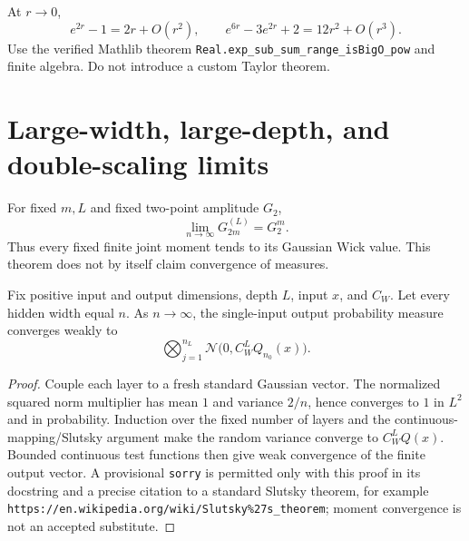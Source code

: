 \begin{lemma}
\label{lem:dln:expRemainders}
At $r\to0$,
\[
 e^{2r}-1=2r+O(r^2),\qquad
 e^{6r}-3e^{2r}+2=12r^2+O(r^3).
\]
Use the verified Mathlib theorem \texttt{Real.exp\_sub\_sum\_range\_isBigO\_pow} and finite
algebra.  Do not introduce a custom Taylor theorem.
\end{lemma}

\section{Large-width, large-depth, and double-scaling limits}

\begin{theorem}
\label{thm:dln:fixedDepthLimit}
For fixed $m,L$ and fixed two-point amplitude $G_2$,
\[
 \lim_{n\to\infty}G_{2m}^{(L)}=G_2^m.
\]
Thus every fixed finite joint moment tends to its Gaussian Wick value.  This theorem does not by
itself claim convergence of measures.
\end{theorem}

\begin{theorem}
\label{thm:dln:weakGaussianLimit}
Fix positive input and output dimensions, depth $L$, input $x$, and $C_W$.  Let every hidden width
equal $n$.  As $n\to\infty$, the single-input output probability measure converges weakly to
\[
 \bigotimes_{j=1}^{n_L}\mathcal N\big(0,C_W^LQ_{n_0}(x)\big).
\]

\begin{proof}
Couple each layer to a fresh standard Gaussian vector.  The normalized squared norm multiplier has
mean $1$ and variance $2/n$, hence converges to $1$ in $L^2$ and in probability.  Induction over
the fixed number of layers and the continuous-mapping/Slutsky argument make the random variance
converge to $C_W^LQ(x)$.  Bounded continuous test functions then give weak convergence of the
finite output vector.  A provisional \texttt{sorry} is permitted only with this proof in its
docstring and a precise citation to a standard Slutsky theorem, for example
\texttt{https://en.wikipedia.org/wiki/Slutsky\%27s\_theorem}; moment convergence is not an accepted
substitute.
\end{proof}
\end{theorem}

